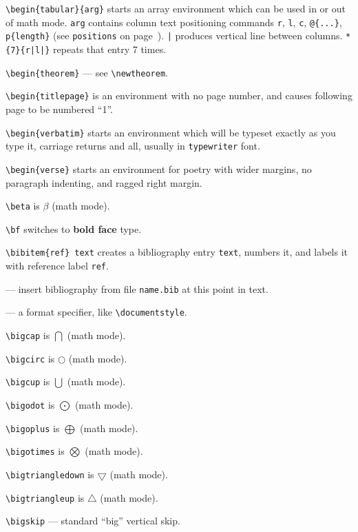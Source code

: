 \verb"\begin{tabular}{arg}" starts an array environment which can be used
	in or out of math mode. \verb"arg" contains column text positioning
	commands \verb"r", \verb"l", \verb"c",
	\verb"@{...}", \verb"p{length}" (see \verb"positions" on
	page~\pageref{pos-ref}). \ifsmallcrib \relax \else \linebreak \fi
	\verb"|" produces vertical line
	between columns. \verb"*{7}{r|l|}" repeats that entry 7 times.

\verb"\begin{theorem}" --- see \verb"\newtheorem".

\verb"\begin{titlepage}" is an environment with no page number, and causes
	following page to be numbered ``1''.

\verb"\begin{verbatim}" starts an environment which will be typeset exactly
	as you type it, carriage returns and all, usually in \verb"typewriter"
	font.

\verb"\begin{verse}" starts an environment for poetry with wider margins,
	no paragraph indenting, and ragged right margin.

\verb"\beta" is $\beta$ (math mode).

\verb"\bf" switches to {\bf bold face} type.

\verb"\bibitem{ref} text" creates a bibliography entry \verb"text",
	numbers it, and labels it with reference label \verb"ref".

\verb"" --- insert bibliography from file \verb"name.bib"
	at this point in text.

\verb"" --- a format specifier, like
	\verb"\documentstyle".

\verb"\bigcap" is $\bigcap$ (math mode).

\verb"\bigcirc" is $\bigcirc$ (math mode).

\verb"\bigcup" is $\bigcup$ (math mode).

\verb"\bigodot" is $\bigodot$ (math mode).

\verb"\bigoplus" is $\bigoplus$ (math mode).

\verb"\bigotimes" is $\bigotimes$ (math mode).

\verb"\bigtriangledown" is $\bigtriangledown$ (math mode).

\verb"\bigtriangleup" is $\bigtriangleup$ (math mode).

\verb"\bigskip" --- standard ``big'' vertical skip.

